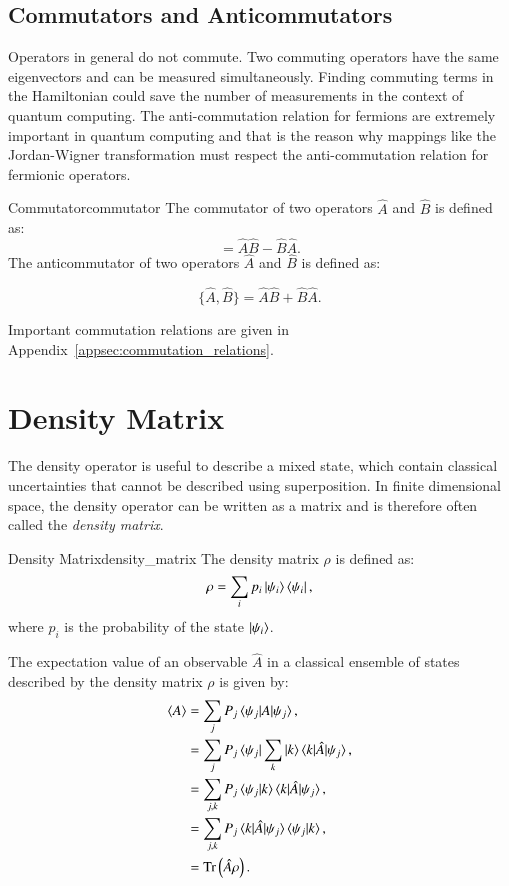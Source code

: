 \subsection{Commutators and Anticommutators}
Operators in general do not commute. Two commuting operators have the same eigenvectors and can be measured simultaneously. Finding commuting terms in the Hamiltonian could save the number of measurements in the context of quantum computing. The anti-commutation relation for fermions are extremely important in quantum computing and that is the reason why mappings like the Jordan-Wigner transformation must respect the anti-commutation relation for fermionic operators.
\begin{definition}{Commutator}{commutator}
	The commutator of two operators $ \hat A $ and $ \hat B $ is defined as:
	\begin{equation}
		[\hat A, \hat B] = \hat A \hat B - \hat B \hat A.
	\end{equation}
		The anticommutator of two operators $ \hat A $ and $ \hat B $ is defined as:
	
	\begin{equation}
		\{\hat A, \hat B\} = \hat A \hat B + \hat B \hat A.
	\end{equation}
\end{definition}

Important commutation relations are given in Appendix~\ref{appsec:commutation_relations}.

\section{Density Matrix}
\label{sec:density_matrix}
The density operator is useful to describe a mixed state, which contain classical uncertainties that cannot be described using superposition. In finite dimensional space, the density operator can be written as a matrix and is therefore often called the \textit{density matrix}.  
\begin{definition}{Density Matrix}{density_matrix}
	The density matrix $ \rho $ is defined as:
	\begin{equation}
		\rho = \sum_{i} p_i \ket{\psi_i}\bra{\psi_i},
	\end{equation}
	where $ p_i $ is the probability of the state $ \ket{\psi_i} $.
\end{definition}

The expectation value of an observable $ \hat A $ in a classical ensemble of states described by the density matrix $ \rho $ is given by:
\begin{equation}
\begin{aligned}
	\braket{A} &= \sum_j P_j \braket{\psi_j|A|\psi_j}, \\
		   &= \sum_j P_j \braket{\psi_j|\sum_k |k} \braket{k|\hat A|\psi_j}, \\
		   &= \sum_{j,k} P_j \braket{\psi_j|k} \braket{k|\hat A|\psi_j}, \\
		   &= \sum_{j,k} P_j \braket{k|\hat A|\psi_j} \braket{\psi_j|k}, \\
		   &= \text{Tr}\left(\hat A \rho\right).
\end{aligned}
\end{equation}

